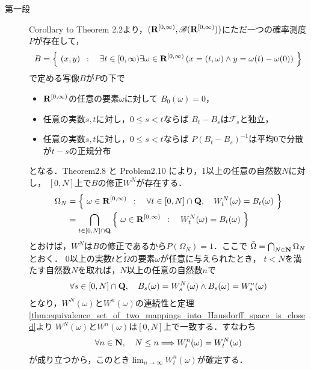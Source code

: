 	\begin{prf}\mbox{}
		\begin{description}
			\item[第一段]
				Corollary to Theorem 2.2より，$(\mathbf{R}^{[0,\infty)},\mathscr{B}(\mathbf{R}^{[0,\infty)}))$にただ一つの確率測度$P$が存在して，
				\begin{align}
					B = \left\{\ (x,y)\ \, : \quad \exists t \in [0,\infty) \exists \omega \in \mathbf{R}^{[0,\infty)}
					\left( x=(t,\omega) \wedge y=\omega(t)-\omega(0) \right)\ \right\}
				\end{align}
				で定める写像$B$が$P$の下で
				\begin{itemize}
					\item $\mathbf{R}^{[0,\infty)}$の任意の要素$\omega$に対して
						$B_0(\omega) = 0$，
					\item 任意の実数$s,t$に対し，$0 \leq s < t$ならば
						$B_t - B_s$は$\mathscr{F}_s$と独立，
					\item 任意の実数$s,t$に対し，$0 \leq s < t$ならば
						$P(B_t - B_s)^{-1}$は平均0で分散が$t-s$の正規分布
				\end{itemize}
				となる．Theorem2.8 と Problem2.10 により，1以上の任意の自然数$N$に対し，
				$[0,N]$上で$B$の修正$W^N$が存在する．
				\begin{align}
					\Omega_N &= \left\{\ \omega \in \mathbf{R}^{[0,\infty)}\ \, : \quad \forall t \in [0,N] \cap \mathbf{Q},
					\quad W_t^N(\omega) = B_t(\omega)\ \right\} \\
					&= \bigcap_{t \in [0,N] \cap \mathbf{Q}} \left\{\ \omega \in \mathbf{R}^{[0,\infty)}\ \, : \quad W_t^N(\omega) = B_t(\omega)\ \right\}
				\end{align}
				とおけば，$W^N$は$B$の修正であるから$P(\Omega_N)=1$．ここで
				$\tilde{\Omega} = \bigcap_{N \in \mathbf{N}}\Omega_N$とおく．
				0以上の実数$t$と$\tilde{\Omega}$の要素$\omega$が任意に与えられたとき，
				$t < N$を満たす自然数$N$を取れば，$N$以上の任意の自然数$n$で
				\begin{align}
					\forall s \in [0,N] \cap \mathbf{Q}, \quad
					B_s(\omega) = W^N_s(\omega) \wedge B_s(\omega) = W^n_s(\omega)
				\end{align}
				となり，$W^N(\omega)$と$W^n(\omega)$の連続性と定理
				\ref{thm:equivalence_set_of_two_mappings_into_Hausdorff_space_is_closed}より
				$W^N(\omega)$と$W^n(\omega)$は$[0,N]$上で一致する．すなわち
				\begin{align}
					\forall n \in \mathbf{N},\quad N \leq n \Longrightarrow W^n_t(\omega)
					= W^N_t(\omega)
				\end{align}
				が成り立つから，このとき$\lim_{n \to \infty} W^n_t(\omega)$が確定する．
				\begin{align}

\end{align}
\end{description}
\end{prf}

